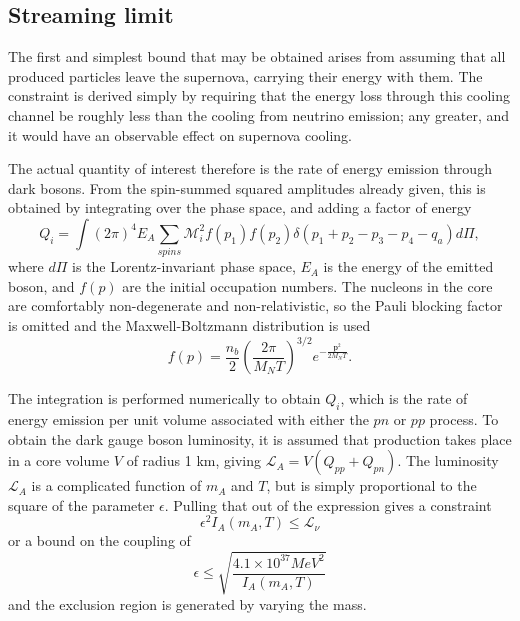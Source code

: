 \documentclass[nofootinbib,aps,prd,preprint,superscriptaddress]{revtex4}
\newcommand{\beq}{\begin{equation}}
\newcommand{\eeq}{\end{equation}}
\begin{document}
\subsection{Streaming limit}
The first and simplest bound that may be obtained arises from assuming that all produced particles leave the supernova, carrying their energy with them. The constraint is derived simply by requiring that the energy loss through this cooling channel be roughly less than the cooling from neutrino emission; any greater, and it would have an observable effect on supernova cooling.

The actual quantity of interest therefore is the rate of energy emission through dark bosons. From the spin-summed squared amplitudes already given, this is obtained by integrating over the phase space, and adding a factor of energy
\beq
Q_i = \int (2\pi)^4 E_A \sum_{spins} \mathcal{M}^2_i f(p_1) f(p_2)\delta(p_1+p_2-p_3-p_4-q_a) d\Pi,
\eeq
where $d\Pi$ is the Lorentz-invariant phase space, $ E_A $ is the energy of the emitted boson, and $ f(p) $ are the initial occupation numbers. The nucleons in the core are comfortably non-degenerate and non-relativistic, so  the Pauli blocking factor is omitted and the Maxwell-Boltzmann distribution is used  
\beq
f(p) =  \frac{n_b}{2} (\frac{2 \pi}{M_N T})^{3/2} e^{-\frac{\textbf{p}^2} {2 M_N T}}.
\eeq
	
The integration is performed numerically to obtain $ Q_i$, which is the rate of energy emission per unit volume associated with either the $pn$ or $pp$ process. To obtain the dark gauge boson luminosity, it is assumed that production takes place in a core volume $V$ of radius 1 km, giving $ \mathcal{L}_A = V(Q_{pp} + Q_{pn}) $. The luminosity $\mathcal{L}_A $ is a complicated function of $ m_A $ and $ T $, but is simply proportional to the square of the parameter $ \epsilon $.  Pulling that out of the expression gives a constraint 
\beq
\epsilon^2 I_A(m_A, T) \le \mathcal{L}_\nu
\eeq
or a bound on the coupling of 
\beq 
\epsilon \le \sqrt{\frac{4.1 \times 10^{37} MeV^2}{I_A(m_A, T)}} 
\eeq 
and the exclusion region is generated by varying the mass. 
\end{document}
